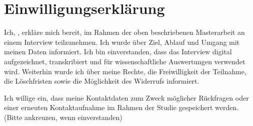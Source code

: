 \documentclass[11pt,a4paper]{article}
\begin{document}
\section*{Einwilligungserklärung}
Ich, \TextField[name=teilnehmer,width=7cm, default={Vorname Name}]{}, erkläre mich bereit,
im Rahmen der oben beschriebenen Masterarbeit an einem Interview teilzunehmen.
Ich wurde über Ziel, Ablauf und Umgang mit meinen Daten informiert.
Ich bin einverstanden, dass das Interview digital aufgezeichnet, transkribiert und für wissenschaftliche Auswertungen verwendet wird.
Weiterhin wurde ich über meine Rechte, die Freiwilligkeit der Teilnahme, die Löschfristen sowie die Möglichkeit des Widerrufs informiert.

\CheckBox[name=kontakt]{} Ich willige ein, dass meine Kontaktdaten zum Zweck möglicher Rückfragen oder einer erneuten Kontaktaufnahme im Rahmen der Studie gespeichert werden. (Bitte ankreuzen, wenn einverstanden)

\vspace{1cm}
 \hspace{1cm} 
\end{document}
